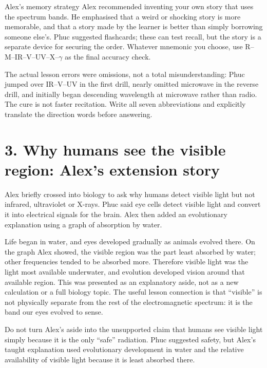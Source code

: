 \documentclass[11pt,a4paper]{article}
\begin{document}
\begin{keybox}{Alex's memory strategy}
Alex recommended inventing your own story that uses the spectrum bands. He emphasised that a weird or shocking story is more memorable, and that a story made by the learner is better than simply borrowing someone else's. Phuc suggested flashcards; these can test recall, but the story is a separate device for securing the order. Whatever mnemonic you choose, use R--M--IR--V--UV--X--$\gamma$ as the final accuracy check.
\end{keybox}

\begin{mistakebox}
The actual lesson errors were omissions, not a total misunderstanding: Phuc jumped over IR--V--UV in the first drill, nearly omitted microwave in the reverse drill, and initially began descending wavelength at microwave rather than radio. The cure is not faster recitation. Write all seven abbreviations and explicitly translate the direction words before answering.
\end{mistakebox}

\section*{3. Why humans see the visible region: Alex's extension story}
Alex briefly crossed into biology to ask why humans detect visible light but not infrared, ultraviolet or X-rays. Phuc said eye cells detect visible light and convert it into electrical signals for the brain. Alex then added an evolutionary explanation using a graph of absorption by water.

Life began in water, and eyes developed gradually as animals evolved there. On the graph Alex showed, the visible region was the part least absorbed by water; other frequencies tended to be absorbed more. Therefore visible light was the light most available underwater, and evolution developed vision around that available region. This was presented as an explanatory aside, not as a new calculation or a full biology topic. The useful lesson connection is that ``visible'' is not physically separate from the rest of the electromagnetic spectrum: it is the band our eyes evolved to sense.

\begin{mistakebox}
Do not turn Alex's aside into the unsupported claim that humans see visible light simply because it is the only ``safe'' radiation. Phuc suggested safety, but Alex's taught explanation used evolutionary development in water and the relative availability of visible light because it is least absorbed there.
\end{mistakebox}
\end{document}
